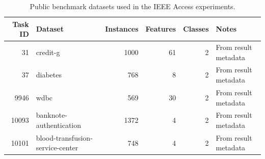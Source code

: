 \begin{table}[t]
\centering
\caption{Public benchmark datasets used in the IEEE Access experiments.}
\label{tab:datasets}
\begin{tabular}{r l r r r l}
        \hline
        Task ID & Dataset & Instances & Features & Classes & Notes \\
        \hline
        31 & credit-g & 1000 & 61 & 2 & From result metadata \\
        37 & diabetes & 768 & 8 & 2 & From result metadata \\
        9946 & wdbc & 569 & 30 & 2 & From result metadata \\
        10093 & banknote-authentication & 1372 & 4 & 2 & From result metadata \\
        10101 & blood-transfusion-service-center & 748 & 4 & 2 & From result metadata \\
        \hline
\end{tabular}
\end{table}
